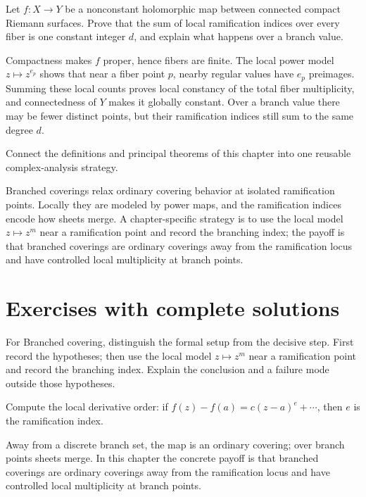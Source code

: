 \begin{problem}\label{prob:iv24-problem-11}
Let $f:X\to Y$ be a nonconstant holomorphic map between connected compact Riemann surfaces. Prove that the sum of local ramification indices over every fiber is one constant integer $d$, and explain what happens over a branch value.
\end{problem}
\begin{solution}
Compactness makes $f$ proper, hence fibers are finite. The local power model $z\mapsto z^{e_p}$ shows that near a fiber point $p$, nearby regular values have $e_p$ preimages. Summing these local counts proves local constancy of the total fiber multiplicity, and connectedness of $Y$ makes it globally constant. Over a branch value there may be fewer distinct points, but their ramification indices still sum to the same degree $d$.
\end{solution}

\begin{problem}\label{prob:iv24-problem-12}
Connect the definitions and principal theorems of this chapter into one reusable complex-analysis strategy.
\end{problem}
\begin{solution}
Branched coverings relax ordinary covering behavior at isolated ramification points. Locally they are modeled by power maps, and the ramification indices encode how sheets merge. A chapter-specific strategy is to use the local model \(z\mapsto z^m\) near a ramification point and record the branching index; the payoff is that branched coverings are ordinary coverings away from the ramification locus and have controlled local multiplicity at branch points.
\end{solution}

\section{Exercises with complete solutions}

\begin{exercise}\label{exr:iv24-01}
For Branched covering, distinguish the formal setup from the decisive step. First record the hypotheses; then use the local model \(z\mapsto z^m\) near a ramification point and record the branching index. Explain the conclusion and a failure mode outside those hypotheses.
\end{exercise}
\begin{hint}
Compute the local derivative order: if \(f(z)-f(a)=c(z-a)^e+\cdots\), then \(e\) is the ramification index.
\end{hint}
\begin{solution}
Away from a discrete branch set, the map is an ordinary covering; over branch points sheets merge. In this chapter the concrete payoff is that branched coverings are ordinary coverings away from the ramification locus and have controlled local multiplicity at branch points.
\end{solution}

